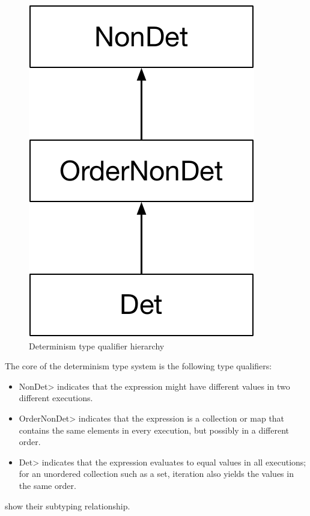 \begin{figure}
    \begin{center}
        \includegraphics[scale=0.37]{detHierarchy}
    \end{center}
    \caption{Determinism type qualifier hierarchy}
    \label{fig:determinism-hierarchy}
\end{figure}

The core of the determinism type system is the following type qualifiers:
\begin{itemize}
    \item \<NonDet> indicates
    that the expression might have different values in two different executions.
    \item \<OrderNonDet> indicates that the expression is a collection or
      map that contains the same elements in every execution, but possibly
      in a different order.
    \item \<Det> indicates that the expression evaluates to equal values in
      all executions; for an unordered collection such as a set, iteration
      also yields the values in the same order.
\end{itemize}
 show their subtyping relationship.

